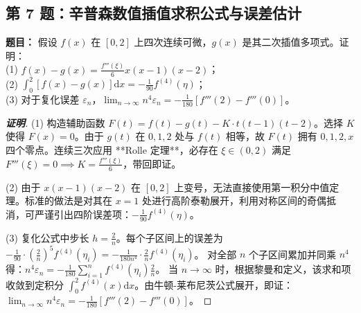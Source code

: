 \documentclass[11pt,a4paper]{article}
\newcommand{\dd}{\mathrm{d}}
\begin{document}
	\begin{tcolorbox}[examstyle]
		\subsection*{第 7 题：辛普森数值插值求积公式与误差估计}
		\textbf{题目：} 假设 $f(x)$ 在 $[0,2]$ 上四次连续可微，$g(x)$ 是其二次插值多项式。证明：\\
		(1) $f(x) - g(x) = \frac{f'''(\xi)}{6}x(x-1)(x-2)$； \\
		(2) $\int_0^2 [f(x) - g(x)]\dd x = -\frac{1}{90}f^{(4)}(\eta)$； \\
		(3) 对于复化误差 $\varepsilon_n$，$\lim_{n \to \infty} n^4 \varepsilon_n = -\frac{1}{180}[f'''(2) - f'''(0)]$。
		
		\begin{proof}[\textbf{证明}]
			(1) 构造辅助函数 $F(t) = f(t) - g(t) - K \cdot t(t-1)(t-2)$。选择 $K$ 使得 $F(x)=0$。由于 $g(t)$ 在 $0,1,2$ 处与 $f(t)$ 相等，故 $F(t)$ 拥有 $0,1,2,x$ 四个零点。连续三次应用 **Rolle 定理**，必存在 $\xi \in (0,2)$ 满足 $F'''(\xi) = 0 \implies K = \frac{f'''(\xi)}{6}$，带回即证。
			
			(2) 由于 $x(x-1)(x-2)$ 在 $[0,2]$ 上变号，无法直接使用第一积分中值定理。标准的做法是对其在 $x=1$ 处进行高阶泰勒展开，利用对称区间的奇偶抵消，可严谨引出四阶误差项：$-\frac{1}{90}f^{(4)}(\eta)$。
			
			(3) 复化公式中步长 $h = \frac{2}{n}$。每个子区间上的误差为 $-\frac{1}{90} \cdot (\frac{2}{n})^5 f^{(4)}(\eta_i) = -\frac{1}{180n^4} \cdot \frac{2}{n} f^{(4)}(\eta_i)$。
			对全部 $n$ 个子区间累加并同乘 $n^4$ 得：$n^4 \varepsilon_n = -\frac{1}{180} \sum_{i=1}^n f^{(4)}(\eta_i)\frac{2}{n}$。
			当 $n \to \infty$ 时，根据黎曼和定义，该求和项收敛到定积分 $\int_0^2 f^{(4)}(x)\dd x$。由牛顿-莱布尼茨公式展开，即证：$\lim_{n \to \infty} n^4 \varepsilon_n = -\frac{1}{180}[f'''(2) - f'''(0)]$。
		\end{proof}
	\end{tcolorbox}
	
\end{document}
